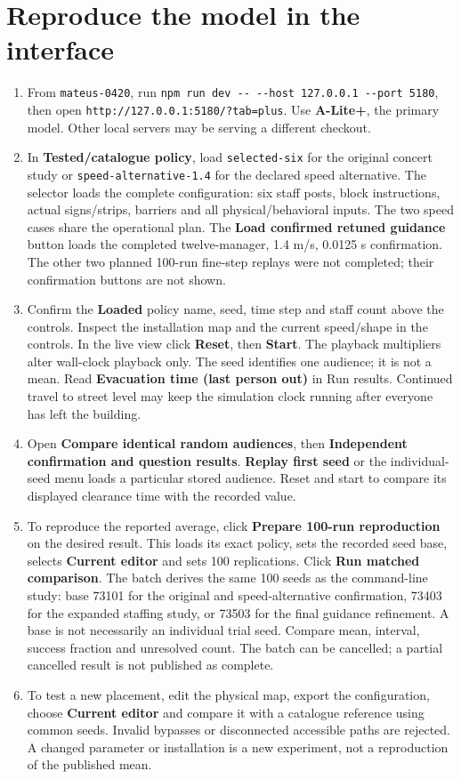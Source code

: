 \documentclass[11pt,a4paper]{article}
\newcommand{\code}[1]{{\small\nolinkurl{#1}}}
\begin{document}
\section{Reproduce the model in the interface}\label{sec:26}

\begin{enumerate}
\item From \code{mateus-0420}, run \code{npm run dev -- --host 127.0.0.1 --port 5180}, then open \code{http://127.0.0.1:5180/?tab=plus}. Use \textbf{A-Lite+}, the primary model. Other local servers may be serving a different checkout.
\item In \textbf{Tested/catalogue policy}, load \code{selected-six} for the original concert study or \code{speed-alternative-1.4} for the declared speed alternative. The selector loads the complete configuration: six staff posts, block instructions, actual signs/strips, barriers and all physical/behavioral inputs. The two speed cases share the operational plan. The \textbf{Load confirmed retuned guidance} button loads the completed twelve-manager, 1.4 m/s, 0.0125 s confirmation. The other two planned 100-run fine-step replays were not completed; their confirmation buttons are not shown.
\item Confirm the \textbf{Loaded} policy name, seed, time step and staff count above the controls. Inspect the installation map and the current speed/shape in the controls. In the live view click \textbf{Reset}, then \textbf{Start}. The playback multipliers alter wall-clock playback only. The seed identifies one audience; it is not a mean. Read \textbf{Evacuation time (last person out)} in Run results. Continued travel to street level may keep the simulation clock running after everyone has left the building.
\item Open \textbf{Compare identical random audiences}, then \textbf{Independent confirmation and question results}. \textbf{Replay first seed} or the individual-seed menu loads a particular stored audience. Reset and start to compare its displayed clearance time with the recorded value.
\item To reproduce the reported average, click \textbf{Prepare 100-run reproduction} on the desired result. This loads its exact policy, sets the recorded seed base, selects \textbf{Current editor} and sets 100 replications. Click \textbf{Run matched comparison}. The batch derives the same 100 seeds as the command-line study: base 73101 for the original and speed-alternative confirmation, 73403 for the expanded staffing study, or 73503 for the final guidance refinement. A base is not necessarily an individual trial seed. Compare mean, interval, success fraction and unresolved count. The batch can be cancelled; a partial cancelled result is not published as complete.
\item To test a new placement, edit the physical map, export the configuration, choose \textbf{Current editor} and compare it with a catalogue reference using common seeds. Invalid bypasses or disconnected accessible paths are rejected. A changed parameter or installation is a new experiment, not a reproduction of the published mean.
\end{enumerate}
\end{document}
